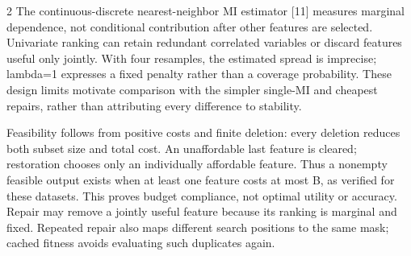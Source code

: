 \documentclass[10pt,a4paper]{article}
\begin{document}
\begin{multicols}{2}
The continuous-discrete nearest-neighbor MI estimator [11] measures marginal dependence, not conditional contribution after other features are selected. Univariate ranking can retain redundant correlated variables or discard features useful only jointly. With four resamples, the estimated spread is imprecise; lambda=1 expresses a fixed penalty rather than a coverage probability. These design limits motivate comparison with the simpler single-MI and cheapest repairs, rather than attributing every difference to stability.

Feasibility follows from positive costs and finite deletion: every deletion reduces both subset size and total cost. An unaffordable last feature is cleared; restoration chooses only an individually affordable feature. Thus a nonempty feasible output exists when at least one feature costs at most B, as verified for these datasets. This proves budget compliance, not optimal utility or accuracy. Repair may remove a jointly useful feature because its ranking is marginal and fixed. Repeated repair also maps different search positions to the same mask; cached fitness avoids evaluating such duplicates again.


\end{multicols}
\end{document}
